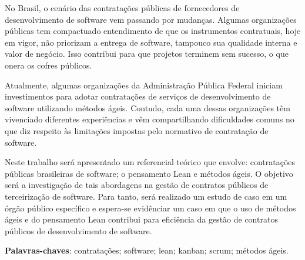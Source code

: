 \begin{resumo}
No Brasil, o cenário das contratações públicas de fornecedores de desenvolvimento de software vem passando por mudanças. Algumas organizações públicas tem compactuado entendimento de que os instrumentos contratuais, hoje em vigor, não priorizam a entrega de software, tampouco sua qualidade interna e valor de negócio. Isso contribui para que projetos terminem sem sucesso, o que onera os cofres públicos.

Atualmente, algumas organizações da Administração Pública Federal iniciam investimentos para adotar contratações de serviços de desenvolvimento de software utilizando métodos ágeis. Contudo, cada uma dessas organizações têm vivenciado diferentes experiências e vêm compartilhando dificuldades comuns no que diz respeito às limitações impostas pelo normativo de contratação de software.

Neste trabalho será apresentado um referencial teórico que envolve: contratações públicas brasileiras de software; o pensamento Lean e métodos ágeis. O objetivo será a investigação de tais abordagens na gestão de contratos públicos de terceirização de software. Para tanto, será realizado um estudo de caso em um órgão público específico e espera-se evidênciar um caso em que o uso de métodos ágeis e do pensamento Lean contribui para eficiência da gestão de contratos públicos de desenvolvimento de software.

\vspace{\onelineskip}
    
 \noindent
 \textbf{Palavras-chaves}: contratações; software; lean; kanban; scrum; métodos ágeis.
\end{resumo}
